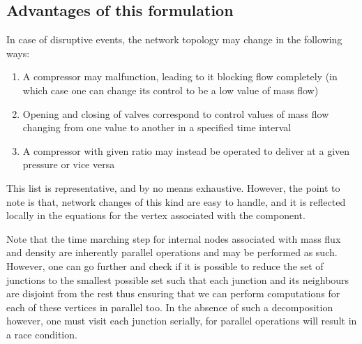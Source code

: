 \documentclass{amsart}
\begin{document}
\subsection{Advantages of this formulation}
In case of disruptive events, the network topology may change in the following ways:
\begin{enumerate}
\item A compressor may malfunction, leading to it blocking flow completely (in which case one can change its control to be a low value of mass flow)
\item Opening and closing of valves correspond to control values of mass flow changing from one value to another in a specified time interval
\item A compressor with given ratio may instead be operated to  deliver at a given pressure or vice versa
\end{enumerate}
This list is representative, and by no means exhaustive. However, the point to note is that, network changes of this kind are easy to handle, and it is reflected locally in the equations for the vertex associated with the component.

Note that the time marching step for internal nodes associated with mass flux and density are inherently parallel operations and may be performed as such. However, one can go further and check if it is possible to reduce the set of junctions to the  smallest possible set such that each junction and its neighbours are disjoint from the rest thus ensuring that we can perform computations for each of these vertices in parallel too. In the absence of such a decomposition however,  one must visit each junction serially, 
for parallel operations will result in a race condition.
\end{document}
